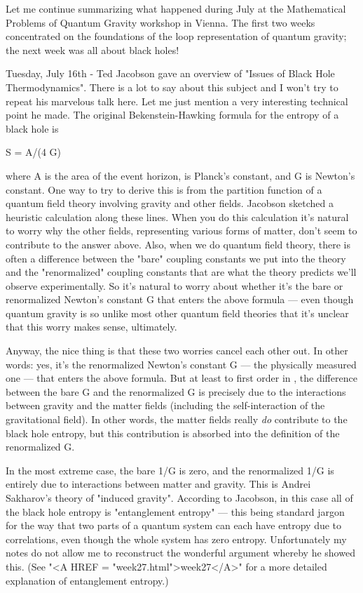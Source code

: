 



Let me continue summarizing what happened during July at the
Mathematical Problems of Quantum Gravity workshop in Vienna.  The
first two weeks concentrated on the foundations of the loop
representation of quantum gravity; the next week was all about black
holes!

Tuesday, July 16th - Ted Jacobson gave an overview of "Issues of Black
Hole Thermodynamics".  There is a lot to say about this subject and I
won't try to repeat his marvelous talk here.  Let me just mention a
very interesting technical point he made.  The original
Bekenstein-Hawking formula for the entropy of a black hole is

S = A/(4 \hbar  G)

where A is the area of the event horizon, \hbar  is Planck's constant,
and G is Newton's constant.  One way to try to derive this is from the
partition function of a quantum field theory involving gravity and
other fields.  Jacobson sketched a heuristic calculation along these
lines.  When you do this calculation it's natural to worry why the
other fields, representing various forms of matter, don't seem to
contribute to the answer above.  Also, when we do quantum field
theory, there is often a difference between the "bare" coupling
constants we put into the theory and the "renormalized" coupling
constants that are what the theory predicts we'll observe
experimentally.  So it's natural to worry about whether it's the bare
or renormalized Newton's constant G that enters the above formula ---
even though quantum gravity is so unlike most other quantum field
theories that it's unclear that this worry makes sense, ultimately.

Anyway, the nice thing is that these two worries cancel each other
out.  In other words: yes, it's the renormalized Newton's constant G
--- the physically measured one --- that enters the above formula.
But at least to first order in \hbar , the difference between the bare G
and the renormalized G is precisely due to the interactions between
gravity and the matter fields (including the self-interaction of the
gravitational field).  In other words, the matter fields really \emph{do}
contribute to the black hole entropy, but this contribution is
absorbed into the definition of the renormalized G.

In the most extreme case, the bare 1/G is zero, and the renormalized
1/G is entirely due to interactions between matter and gravity.  This
is Andrei Sakharov's theory of "induced gravity".  According to
Jacobson, in this case all of the black hole entropy is "entanglement
entropy" --- this being standard jargon for the way that two parts of
a quantum system can each have entropy due to correlations, even
though the whole system has zero entropy.  Unfortunately my notes do
not allow me to reconstruct the wonderful argument whereby he showed
this.  (See "<A HREF = "week27.html">week27</A>" for a more detailed explanation of entanglement
entropy.)

